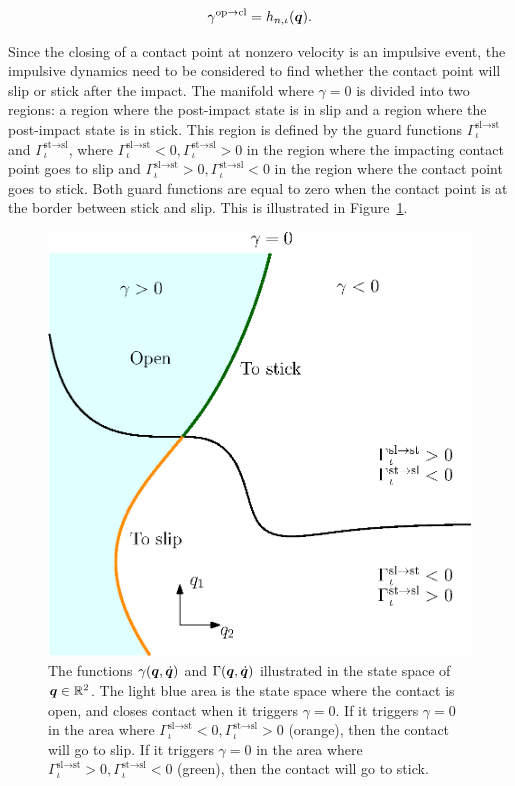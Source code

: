 \documentclass[../DC2017114Bouma.tex]{subfiles}
\begin{document}
\begin{align}
\gamma^{\text{op}\rightarrow\text{cl}} = h_{n,\iota}({\boldsymbol{q}}).
\end{align}

Since the closing of a contact point at nonzero velocity is an impulsive event, the impulsive dynamics need to be considered to find whether the contact point will slip or stick after the impact. The manifold where $\gamma = 0$ is divided into two regions: a region where the post-impact state is in slip and a region where the post-impact state is in stick. This region is defined by the guard functions $\Gamma^{\text{sl}\rightarrow\text{st}}_{\iota}$ and $\Gamma^{\text{st}\rightarrow\text{sl}}_{\iota}$, where $\Gamma^{\text{sl}\rightarrow\text{st}}_{\iota}<0,\Gamma^{\text{st}\rightarrow\text{sl}}_{\iota}>0$ in the region where the impacting contact point goes to slip and $\Gamma^{\text{sl}\rightarrow\text{st}}_{\iota}>0,\Gamma^{\text{st}\rightarrow\text{sl}}_{\iota}<0$ in the region where the contact point goes to stick. Both guard functions are equal to zero when the contact point is at the border between stick and slip. This is illustrated in Figure~\ref{fig:guardopcl}. 
\begin{figure}[bt!]
	\centering
	\includegraphics[width=.6\textwidth]{guardopcl.eps}\caption{The functions $\gamma({\boldsymbol{q}},\dot{{\boldsymbol{q}}})$ and $\Gamma({\boldsymbol{q}},\dot{{\boldsymbol{q}}})$ illustrated in the state space of ${\boldsymbol{q}}\in\mathbb{R}^{2}$. The light blue area is the state space where the contact is open, and closes contact when it triggers $\gamma = 0$. If it triggers $\gamma = 0$ in the area where $\Gamma^{\text{sl}\rightarrow\text{st}}_{\iota}<0,\Gamma^{\text{st}\rightarrow\text{sl}}_{\iota}>0$ (orange), then the contact will go to slip. If it triggers $\gamma=0$ in the area where $\Gamma^{\text{sl}\rightarrow\text{st}}_{\iota}>0,\Gamma^{\text{st}\rightarrow\text{sl}}_{\iota}<0$ (green), then the contact will go to stick.}\label{fig:guardopcl}
\end{figure}
\end{document}
